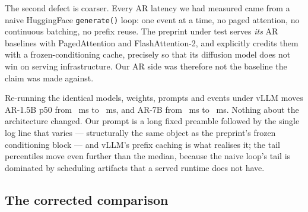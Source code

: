 The second defect is coarser. Every AR latency we had measured came from a
naive HuggingFace \texttt{generate()} loop: one event at a time, no paged
attention, no continuous batching, no prefix reuse. The preprint under test
serves \emph{its} AR baselines with PagedAttention and FlashAttention-2, and
explicitly credits them with a frozen-conditioning cache, precisely so that its
diffusion model does not win on serving infrastructure. Our AR side was
therefore not the baseline the claim was made against.

Re-running the identical models, weights, prompts and events under vLLM moves
AR-1.5B p50 from \arOneFivePFiftyHF~ms to \arOneFivePFiftyVLLM~ms, and AR-7B
from \arSevenPFiftyHF~ms to \arSevenPFifty~ms. Nothing about the architecture
changed. Our prompt is a long fixed preamble followed by the single log line
that varies --- structurally the same object as the preprint's frozen
conditioning block --- and vLLM's prefix caching is what realises it; the tail
percentiles move even further than the median, because the naive loop's tail is
dominated by scheduling artifacts that a served runtime does not have.

\subsection{The corrected comparison}

